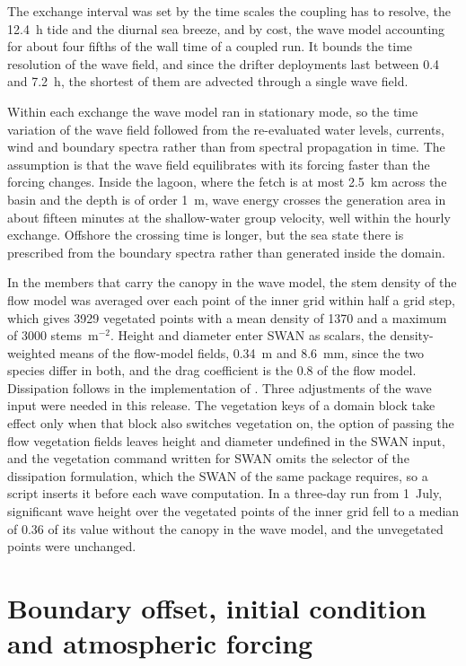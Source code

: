 \documentclass[12pt]{article}
\begin{document}
The exchange interval was set by the time scales the coupling has to resolve,
the 12.4~h tide and the diurnal sea breeze, and by cost, the wave model
accounting for about four fifths of the wall time of a coupled run. It bounds
the time resolution of the wave field, and since the drifter deployments last
between 0.4 and 7.2~h, the shortest of them are advected through a single wave
field.

Within each exchange the wave model ran in stationary mode, so the time
variation of the wave field followed from the re-evaluated water levels,
currents, wind and boundary spectra rather than from spectral propagation in
time. The assumption is that the wave field equilibrates with its forcing
faster than the forcing changes. Inside the lagoon, where the fetch is at most
2.5~km across the basin and the depth is of order 1~m, wave energy crosses the
generation area in about fifteen minutes at the shallow-water group velocity,
well within the hourly exchange. Offshore the crossing time is longer, but the
sea state there is prescribed from the boundary spectra rather than generated
inside the domain.

In the members that carry the canopy in the wave model, the stem density of the
flow model was averaged over each point of the inner grid within half a grid
step, which gives 3929 vegetated points with a mean density of 1370 and a
maximum of 3000 stems~m$^{-2}$. Height and diameter enter SWAN as scalars, the
density-weighted means of the flow-model fields, 0.34~m and 8.6~mm, since the
two species differ in both, and the drag coefficient
is the 0.8 of the flow model. Dissipation follows \citet{Dalrymple1984} in the
implementation of \citet{Suzuki2012}. Three adjustments of the wave input were
needed in this release. The vegetation keys of a domain block take effect only
when that block also switches vegetation on, the option of passing the flow
vegetation fields leaves height and diameter undefined in the SWAN input, and
the vegetation command written for SWAN omits the selector of the dissipation
formulation, which the SWAN of the same package requires, so a script inserts
it before each wave computation. In a three-day run from 1~July, significant
wave height over the vegetated points of the inner grid fell to a median of
0.36 of its value without the canopy in the wave model, and the unvegetated
points were unchanged.

\section{Boundary offset, initial condition and atmospheric forcing}
\label{sec:s_forcing}
\end{document}
